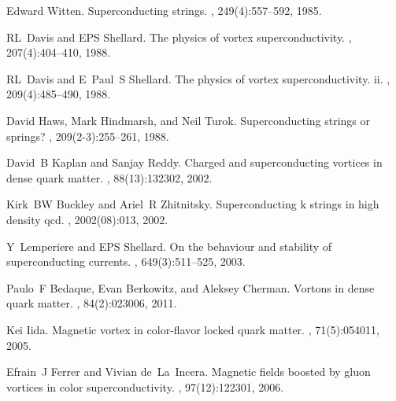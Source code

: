 \documentclass[prd, showpacs,nofootinbib,amsmath,amssymb]{revtex4}
\begin{document}
\begin{thebibliography}{99}
Edward Witten.
\newblock Superconducting strings.
, 249(4):557--592, 1985.

RL~Davis and EPS Shellard.
\newblock The physics of vortex superconductivity.
, 207(4):404--410, 1988.

RL~Davis and E~Paul~S Shellard.
\newblock The physics of vortex superconductivity. ii.
, 209(4):485--490, 1988.

David Haws, Mark Hindmarsh, and Neil Turok.
\newblock Superconducting strings or springs?
, 209(2-3):255--261, 1988.

David~B Kaplan and Sanjay Reddy.
\newblock Charged and superconducting vortices in dense quark matter.
, 88(13):132302, 2002.

Kirk~BW Buckley and Ariel~R Zhitnitsky.
\newblock Superconducting k strings in high density qcd.
, 2002(08):013, 2002.

Y~Lemperiere and EPS Shellard.
\newblock On the behaviour and stability of superconducting currents.
, 649(3):511--525, 2003.

Paulo~F Bedaque, Evan Berkowitz, and Aleksey Cherman.
\newblock Vortons in dense quark matter.
, 84(2):023006, 2011.

Kei Iida.
\newblock Magnetic vortex in color-flavor locked quark matter.
, 71(5):054011, 2005.

Efrain~J Ferrer and Vivian de~La~Incera.
\newblock Magnetic fields boosted by gluon vortices in color superconductivity.
, 97(12):122301, 2006.

\end{thebibliography}
\end{document}
